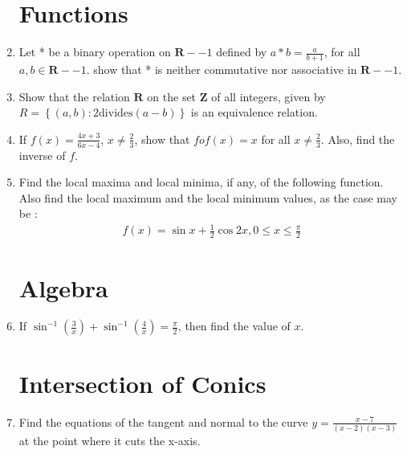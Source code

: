 \documentclass[10pt,-letter paper]{article}
\let\vec\mathbf{}
\let\vec\mathbf{}
\let\vec\mathbf{}
\providecommand{\cbrak}[1]{\ensuremath{\left\{#1\right\}}}
\providecommand{\brak}[1]{\ensuremath{\left(#1\right)}}
\begin{document}
\begin{enumerate}
\section{Functions}
\item Let * be a binary operation on $\vec{R}-{-1}$ defined by $a * b = \frac{a}{{b} + {1}}$, for all $a,b \in \vec{R}-{-1}$. show that * is neither commutative nor associative in $\vec{R}-{-1}$.
\item Show that the relation $\vec{R}$ on the set $\vec{Z}$ of all integers, given by $R = \cbrak{\brak{a,b} :2 \text{divides} \brak{a-b}}$ is an equivalence relation.
\item If $f\brak{x} = \frac{4{x}+3}{6{x}-4}$, ${x}\neq\frac{2}{3}$, show that $fof\brak{x} = {x}$ for all ${x}\neq\frac{2}{3}$. Also, find the inverse of ${f}$.
\item Find the local maxima and local minima, if any, of the following function. Also find the local maximum and the local minimum values, as the case may be : 
	\begin{align*}
		f\brak{x} = \sin{x}+\frac{1}{2} \cos{2x}, 0\leq{x}\leq \frac{\pi}{2}
	\end{align*}
\section{Algebra}
\item If $\sin^{-1}\brak{\frac{3}{x}} + \sin^{-1}\brak{\frac{4}{x}} = \frac{\pi}{2}$, then find the value of $x$.
\section{Intersection of Conics}
\item Find the equations of the tangent and normal to the curve $y = \frac{x-7}{\brak{x-2}\brak{x-3}}$ at the point where it cuts the x-axis.
	\end{enumerate}
	
\end{document}
